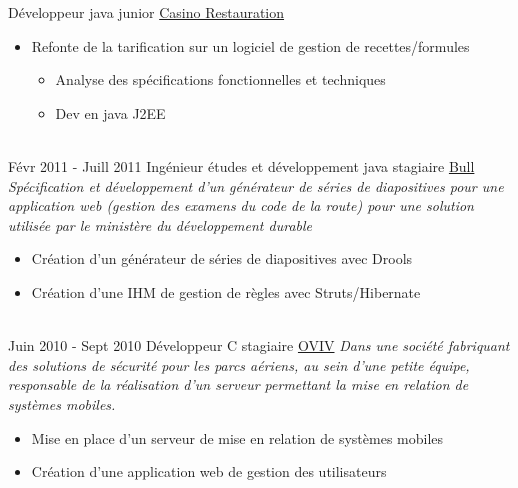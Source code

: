 \documentclass[letterpaper]{twentysecondcv} %
\begin{document}
\begin{twenty}
        {Développeur java junior}
        {\href{http://www.casino-restauration.com/}{Casino Restauration}}
        {}
        {
 {\begin{itemize}
		\item Refonte de la tarification sur un logiciel de gestion de recettes/formules
		{\begin{itemize}
			\item Analyse des spécifications fonctionnelles et techniques
			\item Dev en java J2EE
 		 \end{itemize}}
    \end{itemize}}
        }
    \\   
    \twentyitem
   		{Févr 2011 -}
		{Juill 2011}
        {Ingénieur études et développement java stagiaire}
        {\href{https://atos.net/fr/solutions?utm_source=bull.fr/&utm_medium=301}{Bull}}
        {\textit{Spécification et développement d’un générateur de séries de diapositives pour une application web (gestion des examens du code de la route) pour une solution utilisée par le ministère du développement durable}}
        {
       {\begin{itemize}
		\item Création d'un générateur de séries de diapositives avec Drools
		\item Création d’une IHM de gestion de règles avec Struts/Hibernate
	 \end{itemize}}
        }
     \\
     \twentyitem
   		{Juin 2010 -}
		{Sept 2010}
        {Développeur C stagiaire}
        {\href{}{OVIV}}
        {\textit{Dans une société fabriquant des solutions de sécurité pour les parcs aériens, au sein d’une petite équipe, responsable de la réalisation d’un serveur permettant la mise en relation de systèmes mobiles.
}}
        {
        \begin{itemize}
      	  \item Mise en place d’un serveur de mise en relation de systèmes mobiles
      	  \item  Création d’une application web de gestion des utilisateurs
    \end{itemize}
    	}  
\end{twenty}
\end{document}
